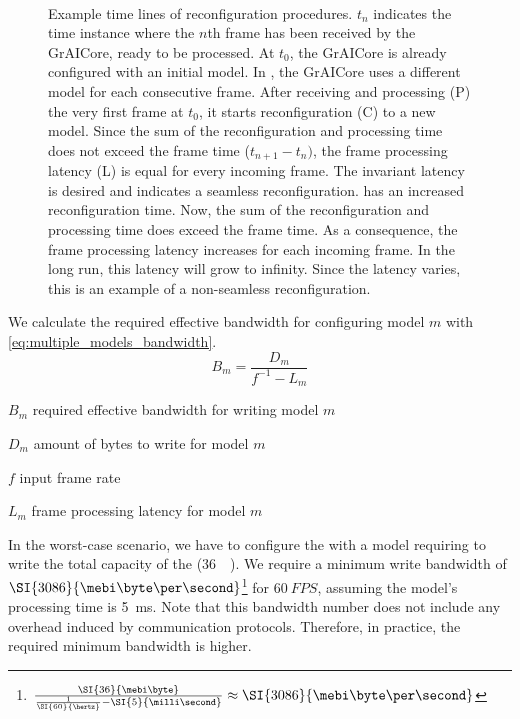\begin{figure}[htbp]
    \centering
    \subfloat[]{
        
        \label{fig:correct_reconfig}
    } \\
    \subfloat[]{
        
        \label{fig:incorrect_reconfig}
    }
    \caption{
    Example time lines of reconfiguration procedures.
    $t_n$ indicates the time instance where the $n$th frame has been received by the GrAICore, ready to be processed.
    At $t_0$, the GrAICore is already configured with an initial model.
    In \protect{}, the GrAICore uses a different model for each consecutive frame.
    After receiving and processing (P) the very first frame at $t_0$, it starts reconfiguration (C) to a new model.
    Since the sum of the reconfiguration and processing time does not exceed the frame time ($t_{n+1} - t_{n})$, the frame processing latency (L) is equal for every incoming frame.
    The invariant latency is desired and indicates a seamless reconfiguration.
    \protect{} has an increased reconfiguration time.
    Now, the sum of the reconfiguration and processing time does exceed the frame time.
    As a consequence, the frame processing latency increases for each incoming frame.
    In the long run, this latency will grow to infinity.
    Since the latency varies, this is an example of a non-seamless reconfiguration.
    }
    \label{fig:reconfig_time_line_ex}
\end{figure}


We calculate the required effective bandwidth for configuring model $m$ with \cref{eq:multiple_models_bandwidth}.
\begin{equation}
    B_m = \frac{D_m}{f^{-1} - L_m}
    \label{eq:multiple_models_bandwidth}
\end{equation}

\begin{eqexpl}[15mm]
    \item{$B_m$} required effective bandwidth for writing model $m$
    \item{$D_m$} amount of bytes to write for model $m$
    \item{$f$} input frame rate
    \item{$L_m$} frame processing latency for model $m$
\end{eqexpl}

In the worst-case scenario, we have to configure the \graicore{} with a model requiring to write the total capacity of the \graicore{} (\SI{36}{\mebi\byte}).
We require a minimum write bandwidth of $\SI{3086}{\mebi\byte\per\second}$\footnote{$\frac{\SI{36}{\mebi\byte}}{\frac{1}{\SI{60}{\hertz}} - \SI{5}{\milli\second}} \approx \SI{3086}{\mebi\byte\per\second}$} for $\SI{60}{FPS}$, assuming the model's processing time is \SI{5}{ms}.
Note that this bandwidth number does not include any overhead induced by communication protocols. Therefore, in practice, the required minimum bandwidth is higher. 

